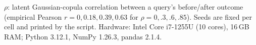 \begin{table}[t]
\vspace{2pt}
\raggedright\scriptsize
$\rho$: latent Gaussian-copula correlation between a query's before/after outcome
(empirical Pearson $r = 0, 0.18, 0.39, 0.63$ for $\rho = 0, .3, .6, .85$).
Seeds are fixed per cell and printed by the script.
Hardware: Intel Core i7-1255U (10 cores), 16\,GB RAM; Python 3.12.1, NumPy 1.26.3, pandas 2.1.4.
\end{table}
